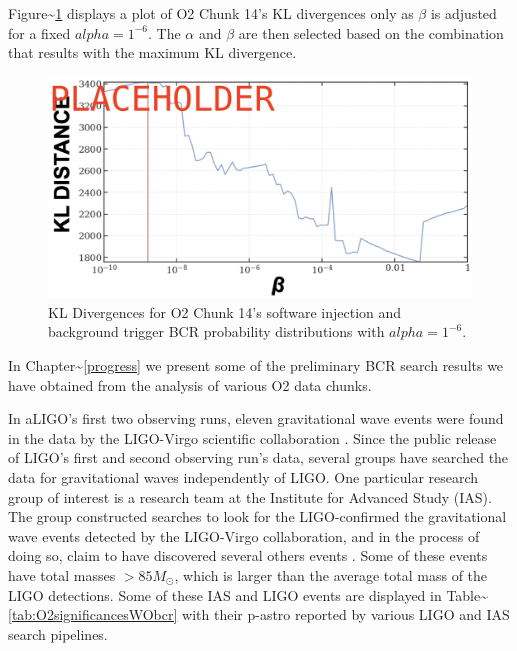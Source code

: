 \documentclass[%
 reprint,
 amsmath,amssymb,
 aps,
]{revtex4}
\begin{document}
Figure\textasciitilde\ref{fig:klDivLine} displays a plot of O2 Chunk 14's KL divergences only as
\(\beta\) is adjusted for a fixed \(alpha=1^{-6}\). The \(\alpha\) and \(\beta\) are then selected
based on the combination that results with the maximum KL divergence.



\begin{figure}[!h]

{\centering \includegraphics[width=0.75\linewidth]{images/kl_distance_14} 

}

\caption[KL Divergences for one BCR tunable parameter]{KL Divergences for O2 Chunk 14's software injection and background trigger BCR probability distributions with \(alpha=1^{-6}\).}\label{fig:klDivLine}
\end{figure}

In Chapter\textasciitilde\ref{progress} we present some of the preliminary BCR search results we
have obtained from the analysis of various O2 data chunks.








In aLIGO's first two observing runs, eleven gravitational wave events were found in the data by the LIGO-Virgo
scientific collaboration \citep{abbott2019gwtc}. Since the public release of LIGO's first and second observing run's data,
several groups have searched the data for gravitational waves independently of LIGO. One particular research group of
interest is a research team at the Institute for Advanced Study (IAS). The group constructed searches to look for the
LIGO-confirmed the gravitational wave events detected by the LIGO-Virgo collaboration, and in the process of doing so,
claim to have discovered several others events \citep{IAS0, IAS1, IAS2}. Some of these events have total masses \(>85 M_{\odot}\), which is larger than the average total mass of the LIGO detections. Some of these IAS and LIGO events are
displayed in Table\textasciitilde\ref{tab:O2significancesWObcr} with their p-astro reported by various LIGO and IAS search pipelines.
\end{document}
